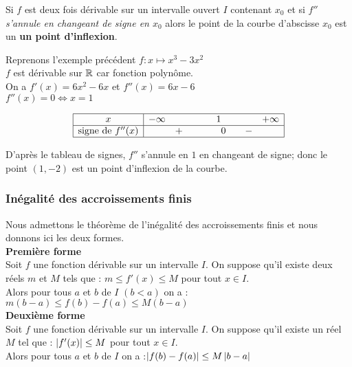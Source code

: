 \begin{example}
\begin{tikzpicture}[scale=0.5]
\end{tikzpicture}
   \begin{theorem}
   Si $ f $ est deux fois dérivable sur  un intervalle ouvert $ I $ contenant $ x_0 $  et si $ f'' $  \emph{ s'annule en changeant de signe  en $ x_0 $} alors le point de la courbe d'abscisse $ x_0 $  est un \textbf{\color{magenta} un point  d'inflexion}.
   \end{theorem}
   
   \begin{example}
   Reprenons l'exemple précédent $ f: x\mapsto x^{3}-3x^{2} $\\ 
   $ f $ est dérivable sur $ \Rr $ car fonction polynôme.\\
   On a $ f'(x)= 6x^2-6x$ et $ f''(x)= 6x-6 $\\
   $ f''(x)=0 \Longleftrightarrow x=1 $
   \renewcommand{\arraystretch}{1.5}

 \[\begin{array}{|c|ccccc|}
\hline
x & \minf & & 1 & & +\infty\\ \hline
\text{signe de } f''(x) & & +\qquad &\quad 0  & \quad - & \\
\hline
\end{array}\]

D'après le tableau de signes,  $ f'' $ s'annule en  $ 1 $ en changeant de signe; donc le point $ (1,-2) $ est un point d'inflexion de la courbe.
   \end{example}
   
  \subsubsection*{Inégalité des accroissements finis}
  Nous admettons le théorème de l'inégalité des accroissements finis et nous donnons ici les deux formes.\\
\textbf{\color{magenta}Première forme} \\
 Soit $ f $ une fonction dérivable sur un intervalle $ I $. On suppose qu'il existe deux réels $m $ et $ M$ tels que :\colorbox{green!20!}{ $ m\leq f'(x) \leq M $} \quad pour tout $ x\in I $. \\ Alors pour tous $a $ et $ b$ de $ I $  $(b < a)  $ on a :\colorbox{green!20!} {$ m(b-a)\leq f(b)-f(a) \leq M(b-a) $}  \\
 
 \textbf{\color{magenta}Deuxième forme} \\
 Soit $ f $ une fonction dérivable sur un intervalle $ I $. On suppose qu'il existe un réel $ M$ tel que :\colorbox{green!20!}{ $ \abs{ f'(x)} \leq M $} \quad pour tout $ x\in I $. \\ Alors pour tous $a $ et $ b$ de $ I $   on a :\colorbox{green!20!} {$ \abs{ f(b)-f(a)}\leq M \abs{b-a}$}
 

\end{example}
